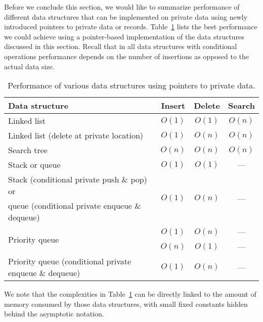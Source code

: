 \documentclass[11pt]{article}
\begin{document}
Before we conclude this section, we would like to summarize performance of
different data structures that can be implemented on private data using
newly introduced pointers to private data or records.
Table~\ref{tab:data-structures} lists the best performance we could achieve
using a pointer-based implementation of the data structures discussed in
this section. Recall that in all data structures with conditional operations
performance depends on the number of insertions as opposed to the actual
data size.
\begin{table} \small \centering 
\begin{tabular}{|l|c|c|c|} \hline
\hfil Data structure & Insert & Delete & Search \\ \hline
Linked list & $O(1)$ & $O(1)$ & $O(n)$ \\ \hline
Linked list (delete at private location) & $O(1)$ & $O(n)$ & $O(n)$ \\ \hline
Search tree & $O(n)$ & $O(n)$ & $O(n)$ \\ \hline
Stack or queue & $O(1)$ & $O(1)$ & --- \\ \hline
Stack (conditional private push \& pop) or & \multirow{2}{*}{$O(1)$} &
\multirow{2}{*}{$O(n)$} & \multirow{2}{*}{---} \\ 
queue (conditional private enqueue \& dequeue) & & & \\ \hline
\multirow{2}{*}{Priority queue} & $O(1)$ & $O(n)$ & --- \\
\cline{2-4}
& $O(n)$ & $O(1)$ & --- \\ \hline
Priority queue (conditional private enqueue \& dequeue) & $O(1)$ & $O(n)$ & --- \\ \hline
\end{tabular}
\caption{Performance of various data structures using pointers to
  private data.} \label{tab:data-structures}
\end{table}
We note that the complexities in Table~\ref{tab:data-structures} can be
directly linked to the amount of memory consumed by those data structures,
with small fixed constants hidden behind the asymptotic notation.
\end{document}
